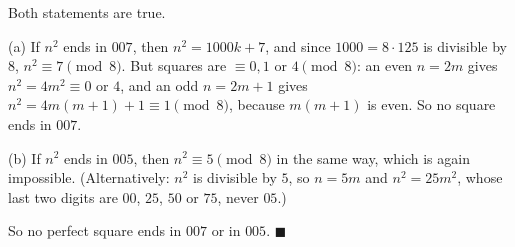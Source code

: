 Both statements are true.

(a) If $n^2$ ends in $007$, then $n^2=1000k+7$, and since $1000=8\cdot125$ is divisible by $8$, $n^2\equiv7\pmod8$. But squares are $\equiv0,1$ or $4\pmod8$: an even $n=2m$ gives $n^2=4m^2\equiv0$ or $4$, and an odd $n=2m+1$ gives $n^2=4m(m+1)+1\equiv1\pmod8$, because $m(m+1)$ is even. So no square ends in $007$.

(b) If $n^2$ ends in $005$, then $n^2\equiv5\pmod8$ in the same way, which is again impossible. (Alternatively: $n^2$ is divisible by $5$, so $n=5m$ and $n^2=25m^2$, whose last two digits are $00$, $25$, $50$ or $75$, never $05$.)

So no perfect square ends in $007$ or in $005$. $\blacksquare$
